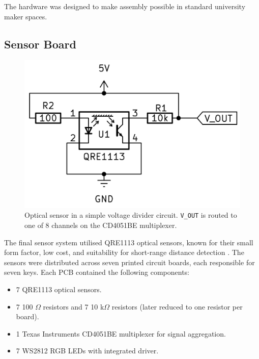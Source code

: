 The hardware was designed to make assembly possible in standard university maker spaces.  

\subsection{Sensor Board}\label{sensor-board}

\begin{figure}[!b] 
  \centering
  \includegraphics[width=0.7\linewidth,trim={0 0.5cm 0 0.5cm},clip]{src/images/simple-schematic-bw-.jpg} 
  \caption{Optical sensor in a simple voltage divider circuit. \texttt{V\_OUT} is routed to one of 8 channels on the CD4051BE multiplexer.}
  \Description{} 
  \label{fig:simple-schematic}
\end{figure}

The final sensor system utilised QRE1113 optical sensors, known for their small form factor, low cost, and suitability for short-range distance detection \cite{McPherson2013, McPherson2019}. The sensors were distributed across seven printed circuit boards, each responsible for seven keys. Each PCB contained the following components:

\begin{itemize}
    \item 7 QRE1113 optical sensors.
    \item 7 100 $\Omega$ resistors and 7 10 k$\Omega$ resistors (later reduced to one resistor per board).
    \item 1 Texas Instruments CD4051BE multiplexer for signal aggregation.
    \item 7 WS2812 RGB LEDs with integrated driver.
\end{itemize}

